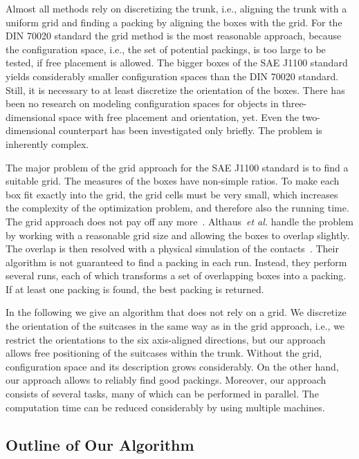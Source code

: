 \documentclass{article}
\newcounter{algo}
\begin{document}
Almost all methods rely on discretizing the trunk, i.e., aligning the
trunk with a uniform grid and finding a packing by aligning the boxes
with the grid. For the DIN 70020 standard the grid method is the most
reasonable approach, because the configuration space, i.e., the set of
potential packings, is too large to be tested, if free placement is
allowed. The bigger boxes of the SAE J1100 standard yields
considerably smaller configuration spaces than the DIN 70020 standard.
Still, it is necessary to at least discretize the orientation of the
boxes. There has been no research on modeling configuration spaces for
objects in three-dimensional space with free placement and
orientation, yet. Even the two-dimensional counterpart has been
investigated only briefly. The problem is inherently complex.

The major problem of the grid approach for the SAE J1100 standard is
to find a suitable grid. The measures of the boxes have non-simple
ratios. To make each box fit exactly into the grid, the grid cells
must be very small, which increases the complexity of the optimization
problem, and therefore also the running time. The grid approach does
not pay off any more~\cite{bsw,Reichel06}. Althaus~\emph{et al.}
handle the problem by working with a reasonable grid size and allowing
the boxes to overlap slightly. The overlap is then resolved with a
physical simulation of the contacts~\cite{bsw}. Their algorithm is not
guaranteed to find a packing in each run. Instead, they perform
several runs, each of which transforms a set of overlapping boxes into
a packing. If at least one packing is found, the best packing is
returned.

In the following we give an algorithm that does not rely on a grid.
We discretize the orientation of the suitcases in the same way as in
the grid approach, i.e., we restrict the orientations to the six
axis-aligned directions, but our approach allows free positioning of
the suitcases within the trunk. Without the grid, configuration space
and its description grows considerably. On the other hand, our
approach allows to reliably find good packings. Moreover, our approach
consists of several tasks, many of which can be performed in
parallel. The computation time can be reduced considerably by using
multiple machines.

\subsection{Outline of Our Algorithm}
\label{sec:algorithm}
\end{document}
